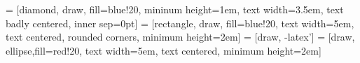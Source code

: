 
\usepackage{ulem}
\usepackage{mathcomp}  %
\usepackage{tikz}
\usepackage{smartdiagram}
\usetikzlibrary{shapes,arrows}
\usetikzlibrary{snakes}



 = [diamond, draw, fill=blue!20, mininum height=1em,
text width=3.5em, text badly centered, inner sep=0pt]
 = [rectangle, draw, fill=blue!20,
text width=5em, text centered, rounded corners, minimum height=2em]
 = [draw, -latex']
 = [draw, ellipse,fill=red!20, text width=5em, text centered,
minimum height=2em]

\usepackage{tabularx}
\usepackage[no-math]{fontspec}

\usepackage{booktabs}  %


\usepackage{xeCJK}                       %
\usepackage{xunicode,xltxtra,beamerthemesplit}

\makeatletter %
\def\@cite#1#2{\textsuperscript{[{#1\if@tempswa , #2\fi}]}}

\makeatletter %
\def\@cite#1#2{\textsuperscript{[{#1\if@tempswa , #2\fi}]}}

\setmainfont[BoldFont=Times New Roman]{Times New Roman} %

\setmonofont{YaHei_Monaco}






